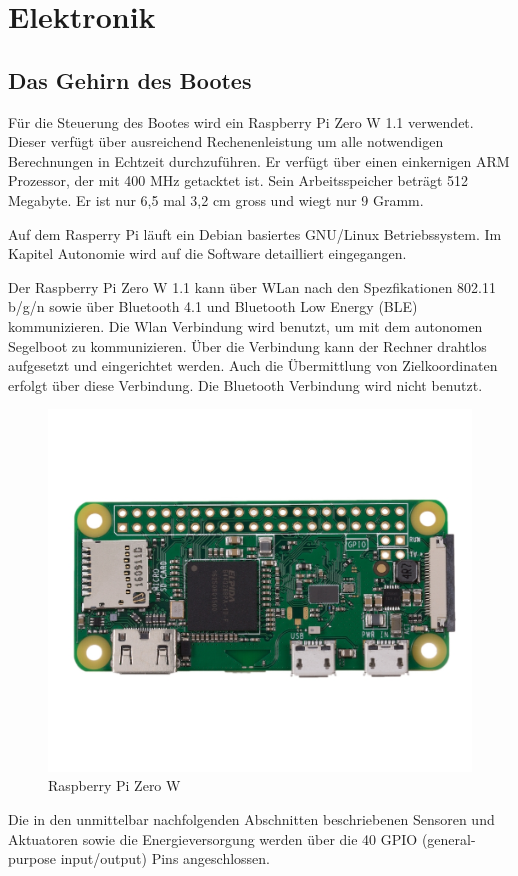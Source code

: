 

\chapter{Elektronik}
\label{chap:elektronik}

\section{Das Gehirn des Bootes}
Für die Steuerung des Bootes wird ein Raspberry Pi Zero W 1.1 verwendet. Dieser verfügt über ausreichend Rechenenleistung um alle notwendigen Berechnungen in Echtzeit durchzuführen. Er verfügt über einen einkernigen ARM Prozessor, der mit 400 MHz getacktet ist. Sein Arbeitsspeicher beträgt 512 Megabyte. Er ist nur 6,5 mal 3,2 cm gross und wiegt nur 9 Gramm.

Auf dem Rasperry Pi läuft ein Debian basiertes GNU/Linux Betriebssystem. Im Kapitel Autonomie wird auf die Software detailliert eingegangen. 

Der Raspberry Pi Zero W 1.1 kann über WLan nach den Spezfikationen 802.11 b/g/n sowie über Bluetooth 4.1 und Bluetooth Low Energy (BLE) kommunizieren. Die  Wlan Verbindung wird benutzt, um mit dem autonomen Segelboot zu kommunizieren. Über die Verbindung kann der Rechner drahtlos aufgesetzt und eingerichtet werden. Auch die Übermittlung von Zielkoordinaten erfolgt über diese Verbindung. Die Bluetooth Verbindung wird nicht benutzt.
\begin{figure}[H]
    \centering
    \includegraphics[width=0.5\linewidth]{assets/raspi Zero.jpg}
    \caption{Raspberry Pi Zero W}
    \label{fig:enter-label}
\end{figure}



Die in den unmittelbar nachfolgenden Abschnitten beschriebenen Sensoren und Aktuatoren sowie die Energieversorgung werden über die 40 GPIO (general-purpose input/output) Pins angeschlossen. 


